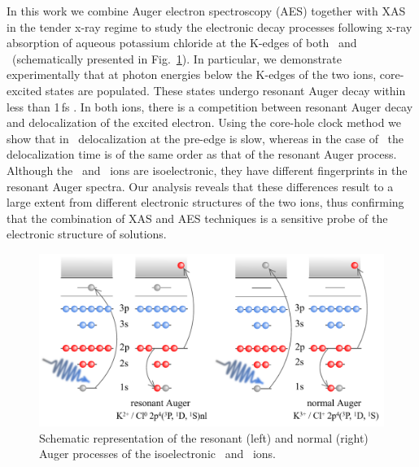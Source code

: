 In this work we combine Auger electron spectroscopy (AES) together with XAS in the tender x-ray regime to study the electronic decay processes following x-ray absorption of aqueous potassium chloride at the K-edges of both \ki~and \cli~(schematically presented in Fig.\ \ref{fg:auger}). In particular, we demonstrate experimentally that at photon energies below the K-edges of the two ions, core-excited states are populated. These states undergo resonant Auger decay within less than 1\,fs \citep{ceolin17:263003}. {\color{red}In both ions, there is a competition between resonant Auger decay and delocalization of the excited electron. Using the core-hole clock method we show that in \ki~delocalization at the pre-edge is slow, whereas in the case of \cli~the delocalization time is of the same order as that of the resonant Auger process.} Although the \ki~and \cli~ions are isoelectronic, they have different fingerprints in the resonant Auger spectra. Our analysis reveals that these differences result to a large extent from different electronic structures of the two ions, thus confirming that the combination of XAS and AES techniques is a sensitive probe of the electronic structure of solutions.




\begin{figure}
\includegraphics[scale=0.7]{figures/auger_process.pdf}
\caption{Schematic representation of the resonant (left) and normal (right) Auger
processes of the isoelectronic \ki~and \cli~ions.}
\label{fg:auger}
\end{figure}

